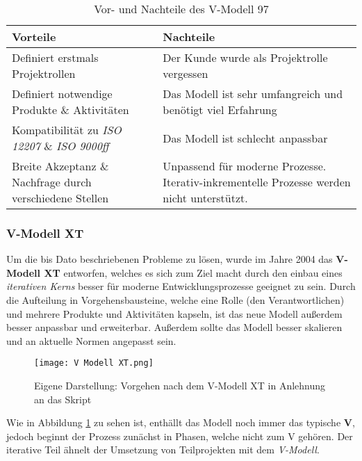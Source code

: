 \begin{table}[H]
    \centering
    \begin{tabulary}{\textwidth}{|>{\centering}p{0.5\textwidth}|p{0.5\textwidth}|}
    \hline 
     Vorteile & Nachteile \\ 
    \hline 
    Definiert erstmals Projektrollen & Der Kunde wurde als Projektrolle vergessen \\
    \hline
    Definiert notwendige Produkte \& Aktivitäten & Das Modell ist sehr umfangreich und benötigt viel Erfahrung \\
    \hline
    Kompatibilität zu \textit{ISO 12207} \& \textit{ISO 9000ff} & Das Modell ist schlecht anpassbar \\
    \hline 
    Breite Akzeptanz \& Nachfrage durch verschiedene Stellen & Unpassend für moderne Prozesse. Iterativ-inkrementelle Prozesse werden nicht unterstützt. \\
    \hline
    \end{tabulary} 
    \caption[Vor- und Nachteile des V-Modell 97]{Vor- und Nachteile des V-Modell 97}
    \label{tabelle_VModell97VorNachteile}
\end{table}

\subsubsection{V-Modell XT}
Um die bis Dato beschriebenen Probleme zu lösen, wurde im Jahre 2004 das \textbf{V-Modell XT} entworfen, welches es sich zum Ziel macht durch den einbau eines \textit{iterativen Kerns} besser für moderne Entwicklungsprozesse geeignet zu sein. Durch die Aufteilung in Vorgehensbausteine, welche eine Rolle (den Verantwortlichen) und mehrere Produkte und Aktivitäten kapseln, ist das neue Modell außerdem besser anpassbar und erweiterbar. Außerdem sollte das Modell besser skalieren und an aktuelle Normen angepasst sein.

\begin{figure}[H]
    \centering
    \texttt{[image: V Modell XT.png]}
    \caption[Vorgehen nach dem V-Modell XT]{Eigene Darstellung: Vorgehen nach dem V-Modell XT in Anlehnung an das Skript}
    \label{abbildung_VModellXT}
\end{figure}

Wie in Abbildung \ref{abbildung_VModellXT} zu sehen ist, enthällt das Modell noch immer das typische \textbf{V}, jedoch beginnt der Prozess zunächst in Phasen, welche nicht zum V gehören. Der iterative Teil ähnelt der Umsetzung von Teilprojekten mit dem \textit{V-Modell}. 

